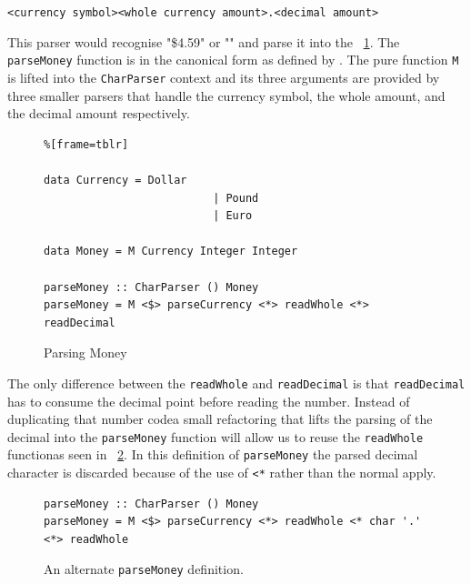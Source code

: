  \DIFaddend \texttt{<currency symbol><whole currency amount>.<decimal amount>}
  \DIFdelbegin {}\DIFdelend \DIFaddbegin 

\DIFaddend This parser would recognise "\$4.59" or "" and parse it into the \DIFdelbegin {}\DIFdelend \DIFaddbegin \texttt{} \DIFaddend ~\ref{parseMoney}. The \texttt{parseMoney} function is in the canonical form as defined by \DIFdelbegin {}\DIFdelend \DIFaddbegin {}\DIFaddend . The pure function \texttt{M} is lifted into the \texttt{CharParser} context and its three arguments are provided by three smaller parsers that handle the currency symbol, the whole amount, and the decimal amount respectively. 


\begin{figure}[t]
 \begin{lstlisting}%[frame=tblr]

data Currency = Dollar
                          | Pound
                          | Euro

data Money = M Currency Integer Integer

parseMoney :: CharParser () Money
parseMoney = M <$> parseCurrency <*> readWhole <*> readDecimal
 \end{lstlisting}
 \caption{Parsing Money}
 \label{parseMoney}
 \end{figure}

The only difference between the \texttt{readWhole} and \texttt{readDecimal} is that \texttt{readDecimal} has to consume the decimal point before reading the number. Instead of duplicating that number code\DIFaddbegin \DIFadd{, }\DIFaddend a small refactoring that lifts the parsing of the decimal into the \texttt{parseMoney} function \DIFdelbegin {}\DIFdelend will allow us to reuse the \texttt{readWhole} function\DIFaddbegin \DIFadd{, }\DIFaddend as seen in \DIFdelbegin {}\DIFdelend \DIFaddbegin {}\DIFaddend ~\ref{altParseMoney}. In this definition of \texttt{parseMoney} the parsed decimal character is discarded because of the use of \texttt{<*} rather than the normal apply.

\begin{figure}[t]
 \begin{lstlisting}
parseMoney :: CharParser () Money
parseMoney = M <$> parseCurrency <*> readWhole <* char '.' <*> readWhole
 \end{lstlisting}
 \caption{An alternate \texttt{parseMoney} definition.}
 \label{altParseMoney}
\end{figure}


